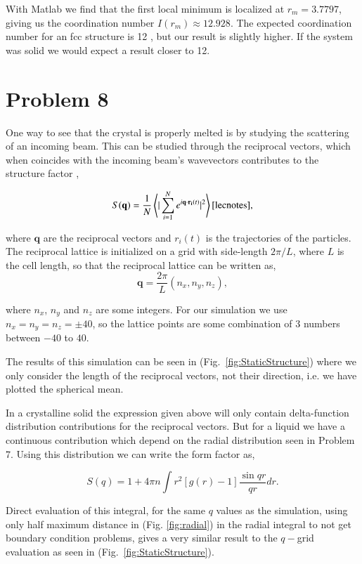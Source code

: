 With Matlab we find that the first local minimum is localized at $r_m = 3.7797$, giving us the coordination number $I(r_m) \approx 12.928$. The expected coordination number for an fcc structure is 12 \cite{al_coordination_nbr}, but our result is slightly higher. If the system was solid we would expect a result closer to 12.

\section*{Problem 8}

One way to see that the crystal is properly melted is by studying the scattering of an incoming beam. This can be studied through the reciprocal vectors, which when coincides with the incoming beam's wavevectors contributes to the structure factor \cite{kittel},

\begin{equation}
S(\mathbf{q})=\frac{1}{N}\left<|\sum_{i=1}^{N}e^{i\mathbf{q}\cdot \mathbf{r_i}(t)}|^2\right>\cite{lecnotes},
\end{equation}

where $\mathbf{q}$ are the reciprocal vectors and $r_i(t)$ is the trajectories of the particles. The reciprocal lattice is initialized on a grid with side-length $2\pi/L$, where $L$ is the cell length, so that the reciprocal lattice can be written as,
$$
	\mathbf{q}=\frac{2\pi}{L}(n_x,n_y,n_z),
$$

where $n_x$, $n_y$ and $n_z$ are some integers. For our simulation we use $n_x=n_y=n_z=\pm40$, so the lattice points are some combination of $3$ numbers between $-40$ to $40$.

The results of this simulation can be seen in (Fig.~\ref{fig:StaticStructure}) where we only consider the length of the reciprocal vectors, not their direction, i.e. we have plotted the spherical mean.

In a crystalline solid the expression given above will only contain delta-function distribution contributions for the reciprocal vectors. But for a liquid we have a continuous contribution which depend on the radial distribution seen in Problem 7. Using this distribution we can write the form factor as,

\begin{equation}
S(q)= 1+ 4\pi n \int r^2\left[g(r)-1\right]\frac{\sin{qr}}{qr}dr.
\end{equation}

Direct evaluation of this integral, for the same $q$ values as the simulation, using only half maximum distance in (Fig. \ref{fig:radial}) in the radial integral to not get boundary condition problems, gives a very similar result to the $q-$grid evaluation as seen in (Fig.~\ref{fig:StaticStructure}).

